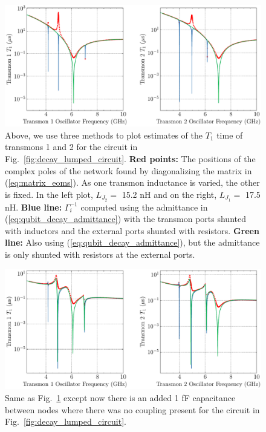 \begin{figure}[!h]
    \centering
    \includegraphics[width=\textwidth]{figures/lumped_transmons_T1.pdf}
    \caption{Above, we use three methods to plot estimates of the $T_1$ time of transmons 1 and 2 for the circuit in Fig.\ \ref{fig:decay_lumped_circuit}. \textbf{Red points:} The positions of the complex poles of the network found by diagonalizing the matrix in (\ref{eq:matrix_eoms}). As one transmon inductance is varied, the other is fixed. In the left plot, $L_{J_2}=$ 15.2 nH and on the right, $L_{J_1} =$ 17.5 nH. \textbf{Blue line:} $\Gamma_i^{-1}$ computed using the admittance in (\ref{eq:qubit_decay_admittance}) with the transmon ports shunted with inductors and the external ports shunted with resistors. \textbf{Green line:} Also using (\ref{eq:qubit_decay_admittance}), but the admittance is only shunted with resistors at the external ports.}
    \label{fig:transmons_T1}
\end{figure}

\clearpage
\begin{figure}[!h]
    \centering
    \includegraphics[width=\textwidth]{figures/lumped_transmons_T1_all_to_all.pdf}
    \caption{Same as Fig.\ \ref{fig:transmons_T1} except now there is an added 1 fF capacitance between nodes where there was no coupling present for the circuit in Fig.\ \ref{fig:decay_lumped_circuit}.}
    \label{fig:transmons_T1_ata}
\end{figure}

